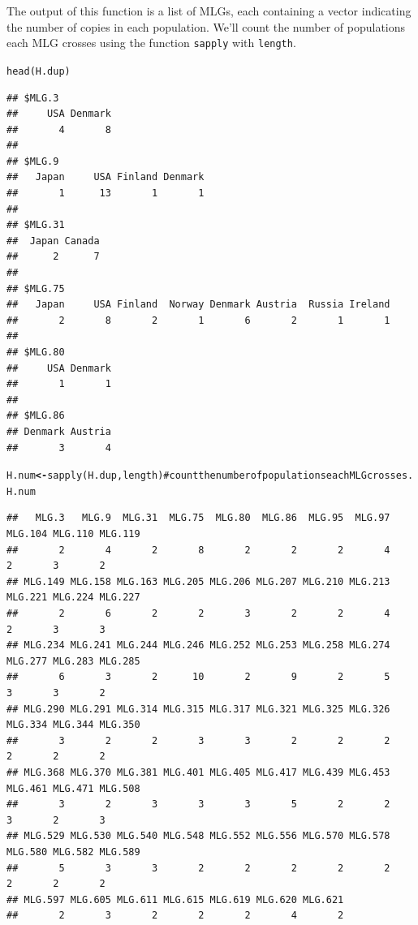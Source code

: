 \documentclass[letterpaper]{article}\usepackage[]{graphicx}\usepackage[]{color}
\makeatletter
\newcommand{\hlcom}[1]{\textcolor[rgb]{1,0.502,0}{#1}}%
\newcommand{\hlstd}[1]{\textcolor[rgb]{0,0,0}{#1}}%
\newcommand{\hlkwb}[1]{\textcolor[rgb]{0.502,0.502,0.753}{\textbf{#1}}}%
\newcommand{\hlkwd}[1]{\textcolor[rgb]{0,0.267,0.4}{#1}}%
\newenvironment{kframe}{%
 \def\at@end@of@kframe{}%
 \ifinner\ifhmode%
  \def\at@end@of@kframe{\end{minipage}}%
  \begin{minipage}{\columnwidth}%
 \fi\fi%
 \def\FrameCommand##1{\hskip\@totalleftmargin \hskip-\fboxsep
 \colorbox{shadecolor}{##1}\hskip-\fboxsep
     \hskip-\linewidth \hskip-\@totalleftmargin \hskip\columnwidth}%
 \MakeFramed {\advance\hsize-\width
   \@totalleftmargin\z@ \linewidth\hsize
   \@setminipage}}%
 {\par\unskip\endMakeFramed%
 \at@end@of@kframe}
\newenvironment{knitrout}{}{} %
\makeatother
\begin{document}
The output of this function is a list of MLGs, each containing a vector indicating the number of copies in each population. We'll count the number of populations each MLG crosses using the function \texttt{sapply} with \texttt{length}.
\begin{knitrout}\footnotesize
{}\color{fgcolor}\begin{kframe}
\begin{alltt}
\hlkwd{head}\hlstd{(H.dup)}
\end{alltt}
\begin{verbatim}
## $MLG.3
##     USA Denmark 
##       4       8 
## 
## $MLG.9
##   Japan     USA Finland Denmark 
##       1      13       1       1 
## 
## $MLG.31
##  Japan Canada 
##      2      7 
## 
## $MLG.75
##   Japan     USA Finland  Norway Denmark Austria  Russia Ireland 
##       2       8       2       1       6       2       1       1 
## 
## $MLG.80
##     USA Denmark 
##       1       1 
## 
## $MLG.86
## Denmark Austria 
##       3       4
\end{verbatim}
\begin{alltt}
\hlstd{H.num} \hlkwb{<-} \hlkwd{sapply}\hlstd{(H.dup, length)}  \hlcom{# count the number of populations each MLG crosses.}
\hlstd{H.num}
\end{alltt}
\begin{verbatim}
##   MLG.3   MLG.9  MLG.31  MLG.75  MLG.80  MLG.86  MLG.95  MLG.97 MLG.104 MLG.110 MLG.119 
##       2       4       2       8       2       2       2       4       2       3       2 
## MLG.149 MLG.158 MLG.163 MLG.205 MLG.206 MLG.207 MLG.210 MLG.213 MLG.221 MLG.224 MLG.227 
##       2       6       2       2       3       2       2       4       2       3       3 
## MLG.234 MLG.241 MLG.244 MLG.246 MLG.252 MLG.253 MLG.258 MLG.274 MLG.277 MLG.283 MLG.285 
##       6       3       2      10       2       9       2       5       3       3       2 
## MLG.290 MLG.291 MLG.314 MLG.315 MLG.317 MLG.321 MLG.325 MLG.326 MLG.334 MLG.344 MLG.350 
##       3       2       2       3       3       2       2       2       2       2       2 
## MLG.368 MLG.370 MLG.381 MLG.401 MLG.405 MLG.417 MLG.439 MLG.453 MLG.461 MLG.471 MLG.508 
##       3       2       3       3       3       5       2       2       3       2       3 
## MLG.529 MLG.530 MLG.540 MLG.548 MLG.552 MLG.556 MLG.570 MLG.578 MLG.580 MLG.582 MLG.589 
##       5       3       3       2       2       2       2       2       2       2       2 
## MLG.597 MLG.605 MLG.611 MLG.615 MLG.619 MLG.620 MLG.621 
##       2       3       2       2       2       4       2
\end{verbatim}
\end{kframe}
\end{knitrout}
\end{document}
